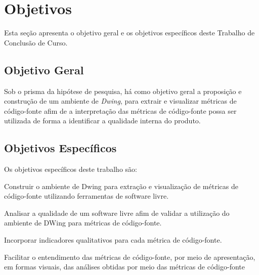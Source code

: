 





\section{Objetivos}

Esta seção apresenta o objetivo geral e os objetivos específicos deste Trabalho de Conclusão de Curso.

\subsection{Objetivo Geral}
Sob o prisma da hipótese de pesquisa, há como objetivo geral a proposição e 
construção de um ambiente de \textit{Dwing}, para extrair e visualizar 
métricas de código-fonte afim de a interpretação das métricas de código-fonte possa ser utilizada de forma a identificar a qualidade interna do produto.



\subsection{Objetivos Específicos}

Os objetivos específicos deste trabalho são:


\begin{objectives}
	\item Construir o ambiente de Dwing para extração e visualização de 
	métricas de código-fonte utilizando ferramentas de software livre. 

	\item Analisar a qualidade de um software livre afim de validar a utilização do ambiente de DWing para métricas de código-fonte.
  
	\item Incorporar indicadores qualitativos para cada métrica de código-fonte.
	
	\item Facilitar o entendimento das métricas de código-fonte, por meio de 
	apresentação, em formas visuais, das análises obtidas por meio das métricas de código-fonte
	
    \end{objectives}
	


